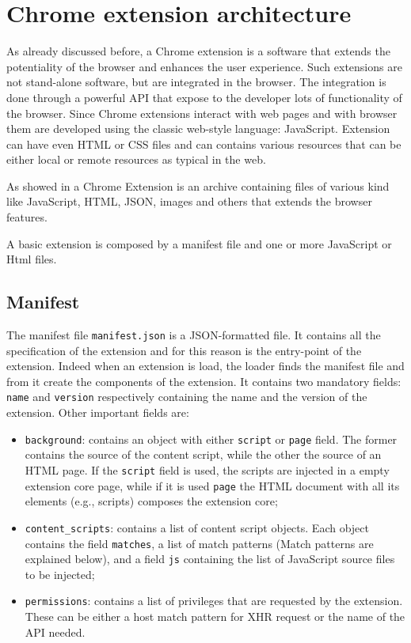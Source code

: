 \section{Chrome extension architecture}
\label{sec:ExtDetails}
As already discussed before, a Chrome extension is a software that extends the potentiality of the browser and enhances the user experience. Such extensions are not stand-alone software, but are integrated in the browser. The integration is done through a powerful API that expose to the developer lots of functionality of the browser. Since Chrome extensions interact with web pages and with browser them are developed using the classic web-style language: JavaScript. Extension can have even HTML or CSS files and can contains various resources that can be either local or remote resources as typical in the web.

As showed in \cite{ChromeExtensionOnline} a Chrome Extension is an archive containing files of various kind like JavaScript, HTML, JSON, images and others that extends the browser features.

A basic extension is composed by a manifest file and one or more JavaScript or Html files.

\subsection{Manifest}
The manifest file \texttt{manifest.json} is a JSON-formatted file. It contains all the specification of the extension and for this reason is the entry-point of the extension. Indeed when an extension is load, the loader finds the manifest file and from it create the components of the extension. It contains two mandatory fields: \texttt{name} and \texttt{version} respectively containing the name and the version of the extension. Other important fields are:
\begin{itemize}
\item \texttt{background}: contains an object with either \texttt{script} or \texttt{page} field. The former contains the source of the content script, while the other the source of an HTML page. If the \texttt{script} field is used, the scripts are injected in a empty extension core page, while if it is used \texttt{page} the HTML document with all its elements (e.g., scripts) composes the extension core;
\item \texttt{content\_scripts}: contains a list of content script objects. Each object contains the field \texttt{matches}, a list of match patterns (Match patterns are explained below), and a field \texttt{js} containing the list of JavaScript source files to be injected;
\item \texttt{permissions}: contains a list of privileges that are requested by the extension. These can be either a host match pattern for XHR request or the name of the API needed.
\end{itemize}

